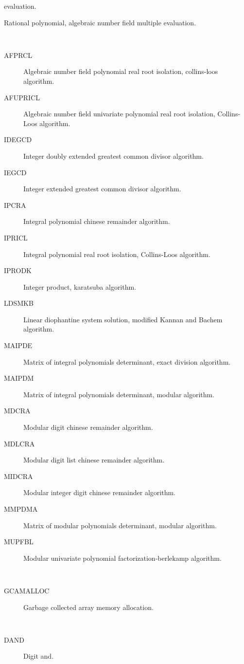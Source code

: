 \begin{description}
\begin{description}
    evaluation.
  \item[RPAFME]  Rational polynomial, algebraic number field multiple
    evaluation.
  \end{description}
\item[algorithm] \ \ 
  \begin{description}
  \item[AFPRCL]  Algebraic number field polynomial real root isolation,
    collins-loos algorithm.
  \item[AFUPRICL]  Algebraic number field univariate polynomial real root
    isolation, Collins-Loos algorithm.
  \item[IDEGCD]  Integer doubly extended greatest common divisor algorithm.
  \item[IEGCD]  Integer extended greatest common divisor algorithm.
  \item[IPCRA]  Integral polynomial chinese remainder algorithm.
  \item[IPRICL]  Integral polynomial real root isolation, Collins-Loos
    algorithm.
  \item[IPRODK]  Integer product, karatsuba algorithm.
  \item[LDSMKB]  Linear diophantine system solution, modified Kannan and
    Bachem algorithm.
  \item[MAIPDE]  Matrix of integral polynomials determinant, exact division
    algorithm.
  \item[MAIPDM]  Matrix of integral polynomials determinant, modular
    algorithm.
  \item[MDCRA]  Modular digit chinese remainder algorithm.
  \item[MDLCRA]  Modular digit list chinese remainder algorithm.
  \item[MIDCRA]  Modular integer digit chinese remainder algorithm.
  \item[MMPDMA]  Matrix of modular polynomials determinant, modular algorithm.
  \item[MUPFBL]  Modular univariate polynomial factorization-berlekamp
    algorithm.
  \end{description}
\item[allocation] \ \ 
  \begin{description}
  \item[GCAMALLOC]  Garbage collected array memory allocation.
  \end{description}
\item[and] \ \ 
  \begin{description}
  \item[DAND]  Digit and.

\end{description}
\end{description}
